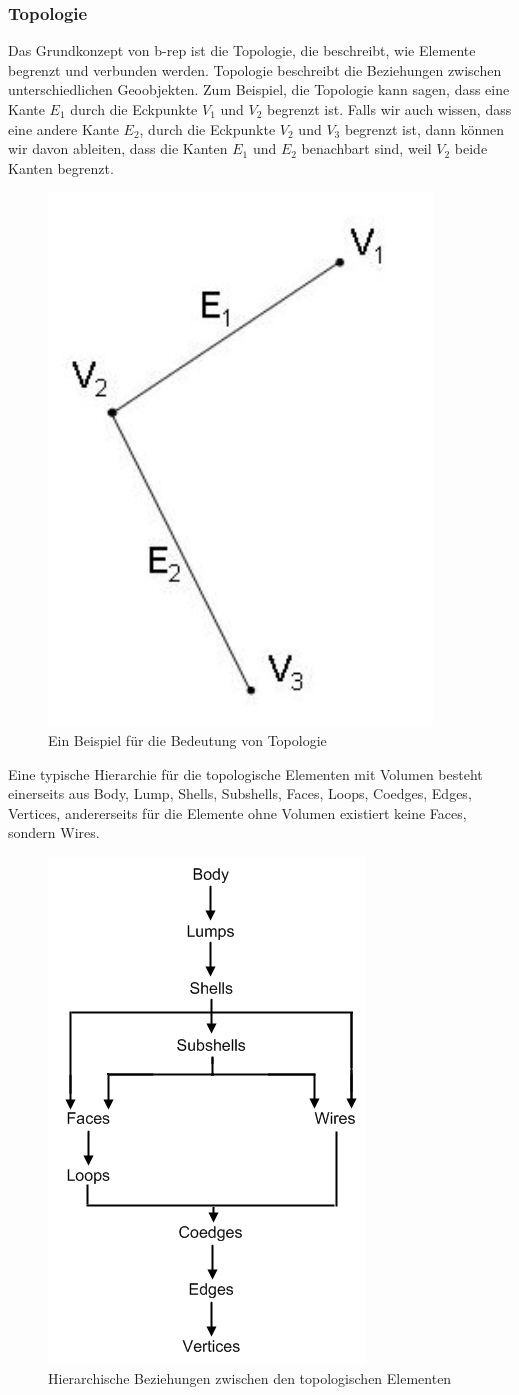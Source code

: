 \documentclass[14pt,a4paper,titlepage]{article}
\begin{document}
	\subsubsection{Topologie}
		Das Grundkonzept von \acf{b-rep} ist die Topologie, die beschreibt, wie Elemente begrenzt und verbunden werden. Topologie beschreibt die Beziehungen zwischen unterschiedlichen Geoobjekten.
		\bigbreak
		Zum Beispiel, die Topologie kann sagen, dass eine Kante \( E_1 \) durch die Eckpunkte  \( V_1 \) und \( V_2 \) begrenzt ist. Falls wir auch wissen, dass eine andere Kante \( E_2 \), durch die Eckpunkte \( V_2 \) und \( V_3 \) begrenzt ist, dann können wir davon ableiten, dass die Kanten \( E_1 \) und \( E_2 \) benachbart sind, weil \( V_2 \) beide Kanten begrenzt. 
				\begin{figure}[h!]
				\centering
				\includegraphics[width=0.25\linewidth]{beispieltopologie.png}
				\caption{Ein Beispiel für die Bedeutung von Topologie}
				\label{fig9}
			\end{figure}
		\pagebreak
		\bigbreak
		Eine typische Hierarchie für die topologische Elementen mit Volumen besteht einerseits aus Body, Lump, Shells, Subshells, Faces, Loops, Coedges, Edges, Vertices, andererseits für die Elemente ohne Volumen existiert keine Faces, sondern Wires.  
			\begin{figure}[h!]
			\centering
			\includegraphics[width=0.5\linewidth]{topology.png}
			\caption{Hierarchische Beziehungen zwischen den topologischen Elementen}
			\label{fig8}
			\end{figure}
	\pagebreak
\end{document}
